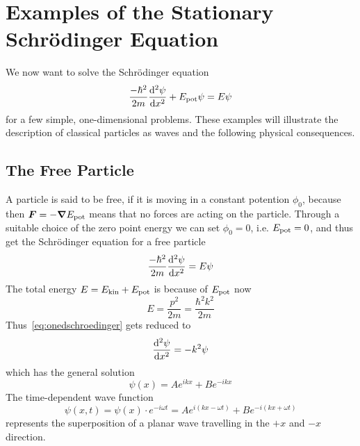 \documentclass[../../script.tex]{subfiles}
\begin{document}
\section[Examples of the Stationary Schrödinger Equation]{Examples of the Stationary Schrödinger Equation}

We now want to solve the Schrödinger equation
\[
	\frac{-\hbar^2}{2m} \dv[2]{\psi}{x} + E_{\text{pot}}\psi = E\psi
\]
for a few simple, one-dimensional problems. These examples will illustrate the description of classical particles as waves and the following physical consequences.

\subsection{The Free Particle}

A particle is said to be free, if it is moving in a constant potention $\phi_0$, because then $\vec{F} = -\grad{\epot}$ means that no forces are acting on the particle. 
Through a suitable choice of the zero point energy we can set $\phi_0 = 0$, i.e. $E_{\text{pot}} = 0$, and thus get the Schrödinger equation for a free particle 
\begin{equation}\label{eq:onedschroedinger}
	\frac{-\hbar^2}{2m} \dv[2]{\psi}{x} = E\psi
\end{equation}
The total energy $E = E_{\text{kin}} + E_{\text{pot}}$ is because of $E_{\text{pot}}$ now 
\[
	E = \frac{p^2}{2m} = \frac{\hbar^2 k^2}{2m}
\]
Thus~\eqref{eq:onedschroedinger} gets reduced to 
\[
	\dv[2]{\psi}{x} = -k^2 \psi
\]
which has the general solution 
\begin{equation}\label{eq:onedsolution}
	\psi(x) = Ae^{ikx} + Be^{-ikx}
\end{equation}
The time-dependent wave function 
\begin{equation}
	\psi(x, t) = \psi(x) \cdot e^{-i\omega t} = Ae^{i(kx - \omega t)} + Be^{-i(kx + \omega t)}
\end{equation}
represents the superposition of a planar wave travelling in the $+x$ and $-x$ direction.
\end{document}
